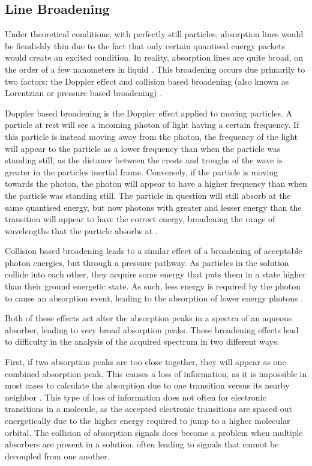 \subsection{Line Broadening}\label{subsec:line_broad}

Under theoretical conditions, with perfectly still particles, absorption lines
would be fiendishly thin due to the fact that only certain quantised energy
packets would create an excited condition. In reality, absorption lines are
quite broad, on the order of a few nanometers in liquid \cite{Hollas:2004uh}.
This broadening occurs due primarily to two factors: the Doppler effect and
collision based broadening (also known as Lorentzian or pressure based
broadening) \cite{Olivero:1977ul}.

Doppler based broadening is the Doppler effect applied to moving particles. A
particle at rest will see a incoming photon of light having a certain
frequency. If this particle is instead moving away from the photon, the
frequency of the light will appear to the particle as a lower frequency than
when the particle was standing still, as the distance between the crests and
troughs of the wave is greater in the particles inertial frame. Conversely, if
the particle is moving towards the photon, the photon will appear to have a
higher frequency than when the particle was standing still. The particle in
question will still absorb at the same quantised energy, but now photons with
greater and lesser energy than the transition will appear to have the correct
energy, broadening the range of wavelengths that the particle absorbs
at \cite{Fox:2006uy}.

Collision based broadening leads to a similar effect of a broadening of
acceptable photon energies, but through a pressure pathway. As particles in
the solution collide into each other, they acquire some energy that puts them
in a state higher than their ground energetic state. As such, less energy is
required by the photon to cause an absorption event, leading to the absorption
of lower energy photons \cite{Ngo:2012jk}.

Both of these effects act alter the absorption peaks in a spectra of an aqueous
absorber, leading to very broad absorption peaks. These broadening effects lead
to difficulty in the analysis of the acquired spectrum in two different ways.

First, if two absorption peaks are too close together, they will appear as one
combined absorption peak. This causes a loss of information, as it is
impossible in most cases to calculate the absorption due to one transition
versus its nearby neighbor \cite{Fowles:1975wg}. This type of loss of
information does not often for electronic transitions in a molecule, as the
accepted electronic transitions are spaced out energetically due to the higher
energy required to jump to a higher molecular orbital. The collision of
absorption signals does become a problem when multiple absorbers are present in
a solution, often leading to signals that cannot be decoupled from one another.

